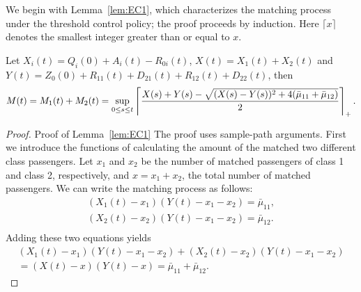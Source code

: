 We begin with Lemma~\ref{lem:EC1}, which characterizes the matching process under the threshold control policy; the proof proceeds by induction.
Here $\lceil x \rceil$ denotes the smallest integer greater than or equal to $x$.

\begin{lemma} \label{lem:EC1}
Let $X_i(t) = Q_i(0) + A_i(t) - R_{0i}(t)$, $X(t)=X_1(t) + X_2(t)$ and $Y(t) = Z_0(0) + R_{11}(t) + D_{21}(t)+ R_{12}(t) + D_{22}(t)$, then
\begin{equation}
M(t) = M_1(t)+M_2(t)
= \sup_{0 \le s \le t} \left\lceil \frac{X(s) + Y(s) - \sqrt{(X(s) - Y(s))^2 + 4(\bar{\mu}_{11}+\bar{\mu}_{12})}}{2} \right\rceil_+ . \label{eq:EC34}
\end{equation}
\end{lemma}

\begin{proof}{Proof of Lemma~\ref{lem:EC1}}
The proof uses sample-path arguments.
First we introduce the functions of calculating the amount of the matched two different class passengers.
Let $x_1$ and $x_2$ be the number of matched passengers of class 1 and class 2, respectively, 
and $x = x_1 + x_2$, the total number of matched passengers.
We can write the matching process as follows:
\begin{equation*}
\begin{split}
    (X_1(t) - x_1)(Y(t) - x_1-x_2) = \bar{\mu}_{11},\\
    (X_2(t) - x_2)(Y(t) - x_1-x_2) = \bar{\mu}_{12}.\\
\end{split}
\end{equation*}
Adding these two equations yields
\begin{equation*}
\begin{split}
    (X_1(t) - x_1)(Y(t) - x_1-x_2) + (X_2(t) - x_2)(Y(t) - x_1-x_2)\\
    = (X(t) - x)(Y(t) - x) = \bar{\mu}_{11} + \bar{\mu}_{12}.
\end{split}
\end{equation*}


\end{proof}
